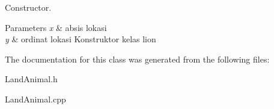 Constructor. 


\begin{DoxyParams}{Parameters}
{\em x} & absis lokasi \\
\hline
{\em y} & ordinat lokasi Konstruktor kelas lion \\
\hline
\end{DoxyParams}


The documentation for this class was generated from the following files\+:\begin{DoxyCompactItemize}
\item 
Land\+Animal.\+h\item 
Land\+Animal.\+cpp\end{DoxyCompactItemize}
